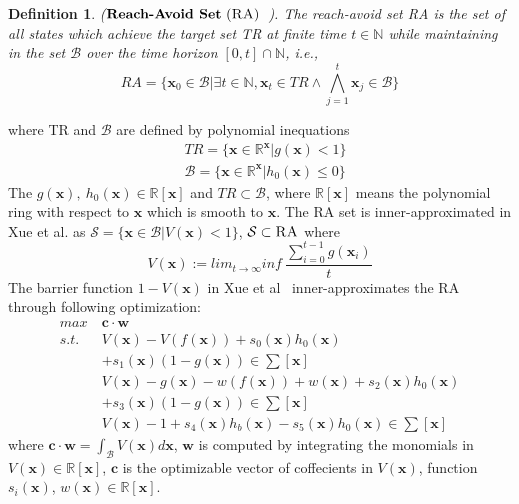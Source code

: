 \documentclass[conference]{IEEEtran}
\newtheorem{definition}{\bf Definition}
\newcommand{\ra}{\textsc{RA}\xspace}
\newcommand{\myvec}[1]{\boldsymbol{#1}}
\newcommand{\calB}{\mathcal{B}}
\newcommand{\calS}{\mathcal{S}}
\begin{document}
\begin{definition}($\textbf{Reach-Avoid Set}\ (\ra)$~\cite{xue2020inner}). 
  The reach-avoid set \ra is 
  the set of all states which 
  achieve the target set TR at 
  finite time $t \in \mathbb{N}$ while 
  maintaining in the set $\calB$ over the 
  time horizon $[0,t] \cap \mathbb{N}$, i.e., 
  \begin{equation}
    RA=\{\myvec{x}_{0} \in \calB | 
    \exists t \in \mathbb{N}, \myvec{x}_{t}\in 
    TR \wedge \bigwedge^{t}_{j=1}\myvec{x}_{j} 
    \in \calB \}\label{eq:RA 1}
  \end{equation}
\end{definition}
where TR and $\calB$ are 
defined by polynomial inequations
\begin{subequations}
  \begin{align}
    &TR = \{ \myvec{x} \in \mathbb{R}^{\myvec{x}} | g(\myvec{x}) < 1 \} \label{eq:RA 2}\\
    &\calB = \{ \myvec{x} \in \mathbb{R}^{\myvec{x}} | h_{0}(\myvec{x}) \leq 0 \}\label{eq:RA 3}
  \end{align}
\end{subequations}
The $g(\myvec{x}),\ h_{0}(\myvec{x}) \in \mathbb{R}[\myvec{x}]$ 
and $TR \subset \calB$, 
where $\mathbb{R}[\myvec{x}]$ means the 
polynomial ring with respect to $\myvec{x}$ which 
is smooth to $\myvec{x}$. 
The \ra set is inner-approximated in Xue et al. as 
$\calS=\{\myvec{x}\in \calB|V(\myvec{x})<1\}$, 
$\calS \subset \ra$ where
\begin{equation}\label{eq:RA 4}
  V(\myvec{x}) := lim_{t \rightarrow \infty}inf\ \frac{\sum_{i=0}^{t-1}g(\myvec{x}_{i})}{t}
\end{equation}
The barrier function $1-V(\myvec{x})$ in 
Xue et al~\cite{xue2020inner} 
inner-approximates the \ra 
through following optimization: 
\begin{subequations}
  \begin{align}
    max\ &\myvec{c}\cdot \myvec{w} \label{eq:lapunov optimization} \\
    s.t.&V(\myvec{x}) - V(f(\myvec{x})) + s_0(\myvec{x})h_{0}(\myvec{x})\nonumber\\ 
    &+ s_1(\myvec{x})(1-g(\myvec{x})) \in \sum[\myvec{x}] \label{eq:RA condition1} \\
    &V(\myvec{x}) - g(\myvec{x}) - w(f(\myvec{x})) + w(\myvec{x}) + s_2(\myvec{x})h_{0}(\myvec{x})\nonumber\\ 
    &+ s_3(\myvec{x})(1-g(\myvec{x})) \in \sum[\myvec{x}] \label{eq:RA condition2} \\
    &V(\myvec{x}) - 1 + s_4(\myvec{x})h_b(\myvec{x}) - s_5(\myvec{x})h_0(\myvec{x}) \in \sum[\myvec{x}] \label{eq:RA condition3}
  \end{align}
\end{subequations}
where $\myvec{c}\cdot \myvec{w} = \int_{\calB}V(\myvec{x})d\myvec{x}$, 
$\myvec{w}$ is computed by integrating the monomials 
in $V(\myvec{x}) \in \mathbb{R}[\myvec{x}]$, 
$\myvec{c}$ is the optimizable vector of coffecients 
in $V(\myvec{x})$, function $s_i(\myvec{x})$, 
$w(\myvec{x})\in 
\mathbb{R}[\myvec{x}]$. 
\end{document}
